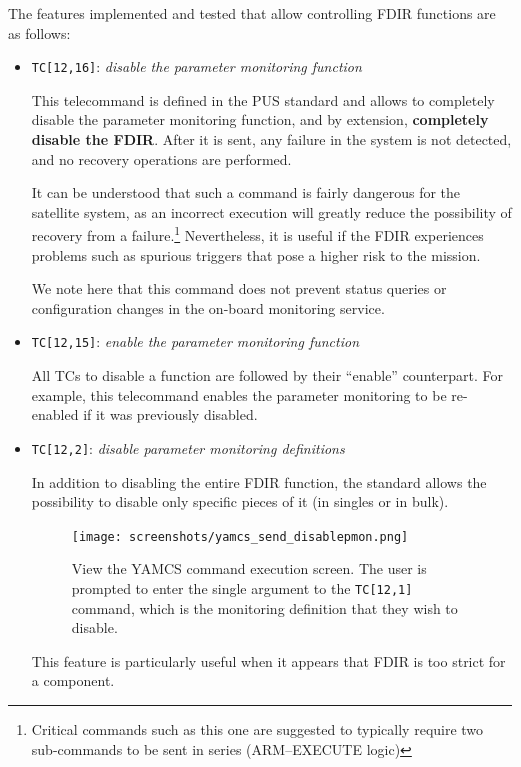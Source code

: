 \documentclass[a4paper,nobib]{tufte-book}
\begin{document}
The features implemented and tested that allow controlling \acs{FDIR} functions are as follows:
\begin{itemize}
	\item \texttt{TC[12,16]}: \emph{disable the parameter monitoring function}
	
	This telecommand is defined in the \acs{PUS} standard and allows to completely disable the parameter monitoring function, and by extension, \textbf{completely disable the \acs{FDIR}}. After it is sent, any failure in the system is not detected, and no recovery operations are performed.
	
	It can be understood that such a command is fairly dangerous for the satellite system, as an incorrect execution will greatly reduce the possibility of recovery from a failure.\footnote{Critical commands such as this one are suggested to typically require two sub-commands to be sent in series (ARM--EXECUTE logic)} Nevertheless, it is useful if the \acs{FDIR} experiences problems such as spurious triggers that pose a higher risk to the mission.
	
	We note here that this command does not prevent status queries or configuration changes in the on-board monitoring service.
	
	\item \texttt{TC[12,15]}: \emph{enable the parameter monitoring function}
	
	All \acsp{TC} to disable a function are followed by their ``enable'' counterpart. For example, this telecommand enables the parameter monitoring to be re-enabled if it was previously disabled.

	\item \texttt{TC[12,2]}: \emph{disable parameter monitoring definitions}
	
	In addition to disabling the entire \acs{FDIR} function, the standard allows the possibility to disable only specific pieces of it (in singles or in bulk).
	
	\begin{figure}[h]
		\texttt{[image: screenshots/yamcs\_send\_disablepmon.png]}
		\caption[View the \acs{YAMCS} command execution screen]{View the \acs{YAMCS} command execution screen. The user is prompted to enter the single argument to the \texttt{TC[12,1]} command, which is the monitoring definition that they wish to disable.}
		\label{fig:yamcssenddisablepmon}
	\end{figure}
	
	This feature is particularly useful when it appears that \acs{FDIR} is too strict for a component.
	

\end{itemize}
\end{document}

